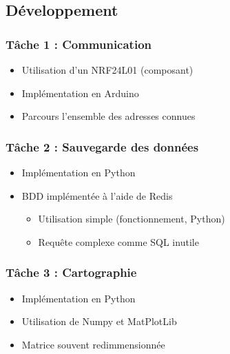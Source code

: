 \documentclass{beamer}
\begin{document}
{      %
      \subsection{Développement}
	\begin{frame} %
	  \frametitle{Tâche 1 : Communication}
	  
	  \begin{itemize}
	    \item Utilisation d'un NRF24L01 (composant)
	    \item Implémentation en Arduino
	    \item Parcours l'ensemble des adresses connues
	  \end{itemize}
	\end{frame}
	
	\begin{frame} %
	  \frametitle{Tâche 2 : Sauvegarde des données}
	  
	  \begin{itemize}
	    \item Implémentation en Python
	    \item BDD implémentée à l'aide de Redis
	    \begin{itemize}
	      \item Utilisation simple (fonctionnement, Python)
	      \item Requête complexe comme SQL inutile
	    \end{itemize}
	  \end{itemize}
	\end{frame}
	
	\begin{frame} %
	  \frametitle{Tâche 3 : Cartographie}
	  
	  \begin{itemize}
	    \item Implémentation en Python
	    \item Utilisation de Numpy et MatPlotLib
	    \item Matrice souvent redimmensionnée
	  \end{itemize}
	\end{frame}
	
}
\end{document}

